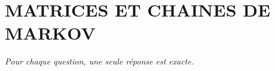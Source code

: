 
\section*{\textcolor{chapcolor}{\MakeUppercase{Matrices et chaines de Markov}}}

\begin{center}
\textit{Pour chaque question, une seule réponse est exacte.}
\end{center}

